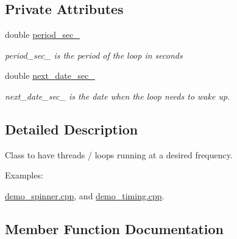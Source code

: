 \subsection*{Private Attributes}
\begin{DoxyCompactItemize}
\item 
double \hyperlink{classreal__time__tools_1_1Spinner_ab227dc08a387d25c5c72fd9dcb164272}{period\+\_\+sec\+\_\+}\hypertarget{classreal__time__tools_1_1Spinner_ab227dc08a387d25c5c72fd9dcb164272}{}\label{classreal__time__tools_1_1Spinner_ab227dc08a387d25c5c72fd9dcb164272}

\begin{DoxyCompactList}\small\item\em period\+\_\+sec\+\_\+ is the period of the loop in seconds \end{DoxyCompactList}\item 
double \hyperlink{classreal__time__tools_1_1Spinner_a1260eb9978b9840df1a21b18f4d6792d}{next\+\_\+date\+\_\+sec\+\_\+}\hypertarget{classreal__time__tools_1_1Spinner_a1260eb9978b9840df1a21b18f4d6792d}{}\label{classreal__time__tools_1_1Spinner_a1260eb9978b9840df1a21b18f4d6792d}

\begin{DoxyCompactList}\small\item\em next\+\_\+date\+\_\+sec\+\_\+ is the date when the loop needs to wake up. \end{DoxyCompactList}\end{DoxyCompactItemize}


\subsection{Detailed Description}
Class to have threads / loops running at a desired frequency. \begin{Desc}
\item[Examples\+: ]\par
\hyperlink{demo_spinner_8cpp-example}{demo\+\_\+spinner.\+cpp}, and \hyperlink{demo_timing_8cpp-example}{demo\+\_\+timing.\+cpp}.\end{Desc}


\subsection{Member Function Documentation}
